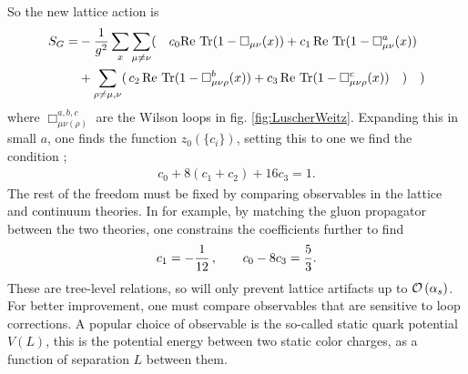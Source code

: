 So the new lattice action is
\begin{align}
  S_G =& - {1\over g^2} \sum_x \sum_{\mu\neq \nu}(\quad c_0 \text{Re Tr} (1-\Box_{\mu\nu}(x)) + c_1 \,\text{Re Tr} (1 - \Box^a_{\mu\nu}(x)) \\
  & + \sum_{\rho\neq \mu,\nu}( \,c_2\, \text{Re Tr} (1 - \Box^b_{\mu\nu\rho}(x)) + c_3 \, \text{Re Tr} (1 - \Box^c_{\mu\nu\rho}(x))\quad)\quad)
\end{align}
where $\Box^{a,b,c}_{\mu\nu(\rho)}$ are the Wilson loops in fig. \ref{fig:LuscherWeitz}. Expanding this in small $a$, one finds the function $z_0(\{c_i\})$, setting this to one we find the condition \cite{WEISZ19831};
\begin{align}
  c_0 + 8 (c_1 + c_2) + 16 c_3 = 1.
\end{align}
The rest of the freedom must be fixed by comparing observables in the lattice and continuum theories. In \cite{WEISZ1984397} for example, by matching the gluon propagator between the two theories, one constrains the coefficients further to find
\begin{align}
  c_1 = -{1\over 12} \,,\quad\quad
  c_0 - 8c_3 = {5\over 3}.
\end{align}
These are tree-level relations, so will only prevent lattice artifacts up to $\mathcal{O}\left( \alpha_s \right)$. For better improvement, one must compare observables that are sensitive to loop corrections. A popular choice of observable is the so-called static quark potential $V(L)$, this is the potential energy between two static color charges, as a function of separation $L$ between them.

